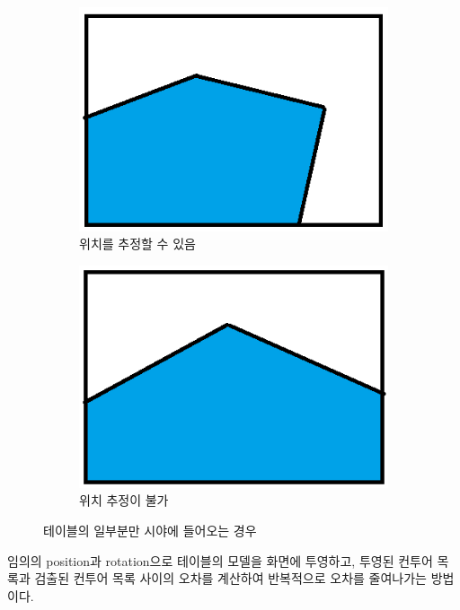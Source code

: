 \documentclass[11pt]{oblivoir}
\begin{document}
    \begin{figure}[h]
        \centering
        \begin{subfigure}{0.4\textwidth}
            \includegraphics[width=\textwidth]{img/partial-table-valid-case.png}
            \caption{위치를 추정할 수 있음}
        \end{subfigure}
        \centering
        \begin{subfigure}{0.4\textwidth}
            \includegraphics[width=\textwidth]{img/partial-table-invalid-case.png}
            \caption{위치 추정이 불가}
        \end{subfigure}
        \caption{테이블의 일부분만 시야에 들어오는 경우}
    \end{figure}

    임의의 position과 rotation으로 테이블의 모델을 화면에 투영하고, 투영된 컨투어 목록과 검출된 컨투어 목록 사이의 오차를 계산하여 반복적으로 오차를 줄여나가는 방법이다.
\end{document}
